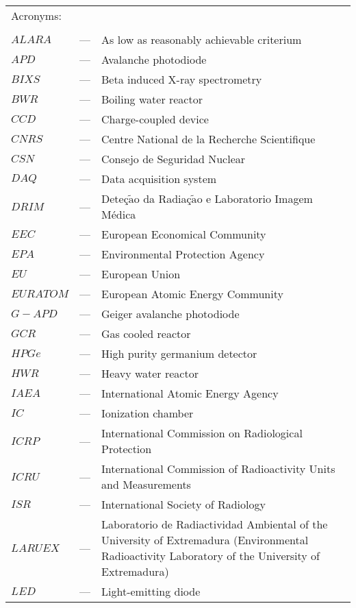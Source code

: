 \begin{longtable}{p{25mm} c p{120mm} }
\multicolumn{3}{l}{Acronyms:}\\
\\
$ALARA$ & --- & As low as reasonably achievable criterium\\
$APD$ & --- & Avalanche photodiode\\
$BIXS$ & --- & Beta induced X-ray spectrometry\\
$BWR$ & --- & Boiling water reactor\\
$CCD$ & --- & Charge-coupled device\\
$CNRS$ & --- & Centre National de la Recherche Scientifique\\
$CSN$ & --- & Consejo de Seguridad Nuclear\\
$DAQ$ & --- & Data acquisition system\\
$DRIM$ & --- & Deteç$\tilde{\text{a}}$o da Radiaç$\tilde{\text{a}}$o e Laboratorio Imagem Médica\\
$EEC$ & --- & European Economical Community\\
$EPA$ & --- & Environmental Protection Agency\\
$EU$ & --- & European Union\\
$EURATOM$ & --- & European Atomic Energy Community\\
$G-APD$ & --- & Geiger avalanche photodiode\\
$GCR$ & --- & Gas cooled reactor\\
$HPGe$ & --- & High purity germanium detector\\
$HWR$ & --- & Heavy water reactor\\
$IAEA$ & --- & International Atomic Energy Agency \\
$IC$ & --- & Ionization chamber\\
$ICRP$ & --- & International Commission on Radiological Protection \\
$ICRU$ & --- & International Commission of Radioactivity Units 
\newline
and Measurements\\
$ISR$ & --- & International Society of Radiology \\
$LARUEX$ & --- & Laboratorio de Radiactividad Ambiental of the University
\newline
of Extremadura (Environmental Radioactivity Laboratory
\newline
of the University of Extremadura)\\
$LED$ & --- & Light-emitting diode \\

\end{longtable}
